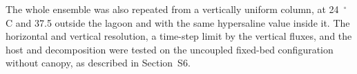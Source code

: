 The whole ensemble was also repeated from a vertically uniform column, at
24~$^\circ$C and 37.5 outside the lagoon and with the same hypersaline value
inside it. The horizontal and vertical resolution, a time-step limit by the
vertical fluxes, and the host and decomposition were tested on the uncoupled
fixed-bed configuration without canopy, as described in Section~S6.
